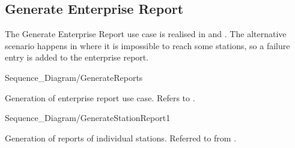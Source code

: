 \subsection{Generate Enterprise Report}
\madeby{\mb}{\kj}

The Generate Enterprise Report use case is realised in  and . The alternative scenario happens in  where it is impossible to reach some stations, so a failure entry is added to the enterprise report.

\begin{mylandscapefigure}{Sequence_Diagram/GenerateReports}
\caption{Generation of enterprise report use case. Refers to . \madeby{\mb}{\kj}}
\label{fig:enterprisereport}
\end{mylandscapefigure}

\begin{myfigure}{Sequence_Diagram/GenerateStationReport}{1}
\caption{Generation of reports of individual stations. Referred to from . \madeby{\mb}{\kj}}
\label{fig:stationreport}
\end{myfigure}

